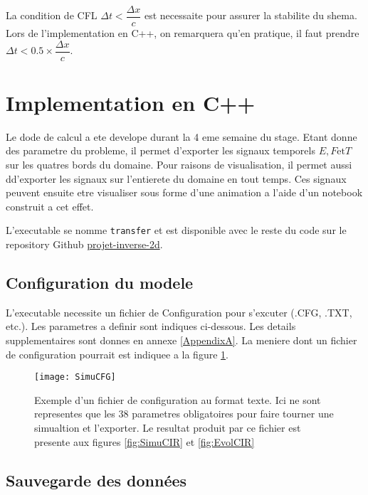 La condition de CFL $\Delta t < \dfrac{\Delta x}{c}$ est necessaite pour assurer la stabilite du shema. Lors de l'implementation en C++, on remarquera qu'en pratique, il faut prendre $\Delta t < 0.5 \times \dfrac{\Delta x}{c}.$ 

\section{Implementation en C++}

Le dode de calcul a ete develope durant la 4 eme semaine du stage. Etant donne des parametre du probleme, il permet d'exporter les signaux temporels $E, F \text{et} T$ sur les quatres bords du domaine. Pour raisons de visualisation, il permet aussi dd'exporter les signaux sur l'entierete du domaine en tout temps. Ces signaux peuvent ensuite etre visualiser sous forme d'une animation a l'aide d'un notebook construit a cet effet.

L'executable se nomme \verb|transfer| et est disponible avec le reste du code sur le repository Github \href{https://github.com/desmond-rn/projet-inverse-2d}{projet-inverse-2d}.

\subsection{Configuration du modele}

L'executable necessite un fichier de Configuration pour s'excuter (.CFG, .TXT, etc.). Les parametres a definir sont indiques ci-dessous. Les details supplementaires sont donnes en annexe \ref{AppendixA}. La meniere dont un fichier de configuration pourrait est indiquee a la figure \ref{fig:SimuCFG}.

\begin{figure}[!h]
\centering
\texttt{[image: SimuCFG]} 
\decoRule
\caption[SimuCFG]{Exemple d'un fichier de configuration au format texte. Ici ne sont representes que les 38 parametres obligatoires pour faire tourner une simualtion et l'exporter. Le resultat produit par ce fichier est presente aux figures \ref{fig:SimuCIR} et \ref{fig:EvolCIR}}
\label{fig:SimuCFG}
\end{figure}


\subsection{Sauvegarde des données}

